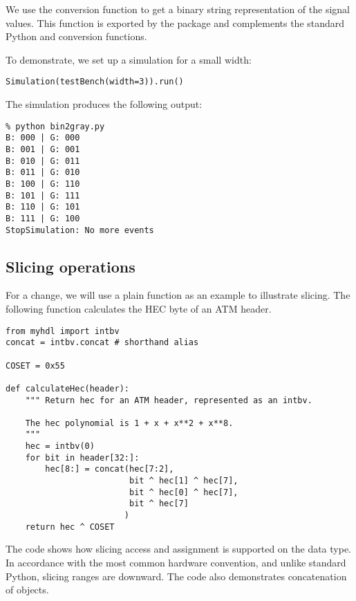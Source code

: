 We use the conversion function  to get a binary
string representation of the signal values. This function is exported
by the  package and complements the standard Python
 and  conversion functions.

To demonstrate, we set up a simulation for a small width: 

\begin{verbatim}
Simulation(testBench(width=3)).run()

\end{verbatim}

The simulation produces the following output:

\begin{verbatim}
% python bin2gray.py
B: 000 | G: 000
B: 001 | G: 001
B: 010 | G: 011
B: 011 | G: 010
B: 100 | G: 110
B: 101 | G: 111
B: 110 | G: 101
B: 111 | G: 100
StopSimulation: No more events

\end{verbatim}

\subsection{Slicing operations}

For a change, we will use a plain function as an example to illustrate
slicing.  The following function calculates the HEC byte of an ATM
header.

\begin{verbatim}
from myhdl import intbv
concat = intbv.concat # shorthand alias

COSET = 0x55

def calculateHec(header):
    """ Return hec for an ATM header, represented as an intbv.

    The hec polynomial is 1 + x + x**2 + x**8.
    """
    hec = intbv(0)
    for bit in header[32:]:
        hec[8:] = concat(hec[7:2],
                         bit ^ hec[1] ^ hec[7],
                         bit ^ hec[0] ^ hec[7],
                         bit ^ hec[7]
                        )
    return hec ^ COSET

\end{verbatim}

The code shows how slicing access and assignment is supported on the
 data type. In accordance with the most common hardware
convention, and unlike standard Python, slicing ranges are
downward. The code also demonstrates concatenation of 
objects.

